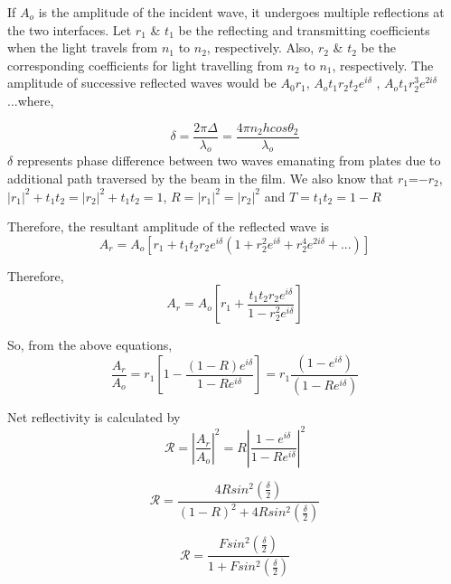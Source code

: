 \documentclass[a4paper, amsfonts, amssymb, amsmath, reprint, showkeys, nofootinbib, twoside]{revtex4-1}
\begin{document}
If $A_o$ is the amplitude of the incident wave, it undergoes multiple reflections at the two interfaces. Let $r_1$ \& $t_1$ be the reflecting and transmitting coefficients when the light travels from $n_1$ to $n_2$, respectively. Also, $r_2$ \& $t_2$ be the corresponding coefficients for light travelling from  $n_2$ to $n_1$, respectively. The amplitude of successive reflected waves would be $A_0 r_1$, $A_o t_1 r_2 t_2 e^{i\delta}$ , $ A_o t_1 r_2^{3}  e^{2i\delta}$...where,

\begin{equation}
\delta=\frac{2\pi\Delta}{\lambda_o}= \frac{4\pi n_2 h cos\theta_2}{\lambda_o}
\end{equation}
\newline
$\delta$ represents phase difference between two waves emanating from plates due to additional path traversed by the beam in the film. We also know that $r_1$=$-r_2$, $|r_1|^2+t_1t_2=|r_2|^2+t_1t_2=1$, $R=|r_1|^2=|r_2|^2$ and $T=t_1t_2=1-R$

Therefore, the resultant amplitude of the reflected wave is 
\begin{equation}
A_r=A_o[r_1+t_1t_2r_2 e^{i\delta}(1+r_2^{2}e^{i\delta}+r_2^{4}e^{2i\delta}+...)]
\end{equation}

Therefore,
\begin{equation}
A_r=A_o\left[r_1+\frac{t_1t_2r_2 e^{i\delta}}{1-r_2^{2}e^{i\delta}}\right]
\end{equation}

So, from the above equations,
\begin{equation}
\frac{A_r}{A_o}=r_1\left[1-\frac{(1-R) e^{i\delta}}{1-Re^{i\delta}}\right]=r_1\frac{(1-e^{i\delta})}{(1-Re^{i\delta})}
\end{equation}

Net reflectivity is calculated by 
\begin{equation}
\mathcal{R}=\left|\frac{A_r}{A_o}\right|^2=R\left|\frac{1-e^{i\delta}}{1-Re^{i\delta}}\right|^2
\end{equation}

\begin{equation}
\mathcal{R}=\frac{4Rsin^{2}(\frac{\delta}{2})}{(1-R)^2+4Rsin^{2}(\frac{\delta}{2})}
\end{equation}

\begin{equation}
\mathcal{R}=\frac{Fsin^{2}(\frac{\delta}{2})}{1+Fsin^{2}(\frac{\delta}{2})}
\end{equation}
\end{document}
